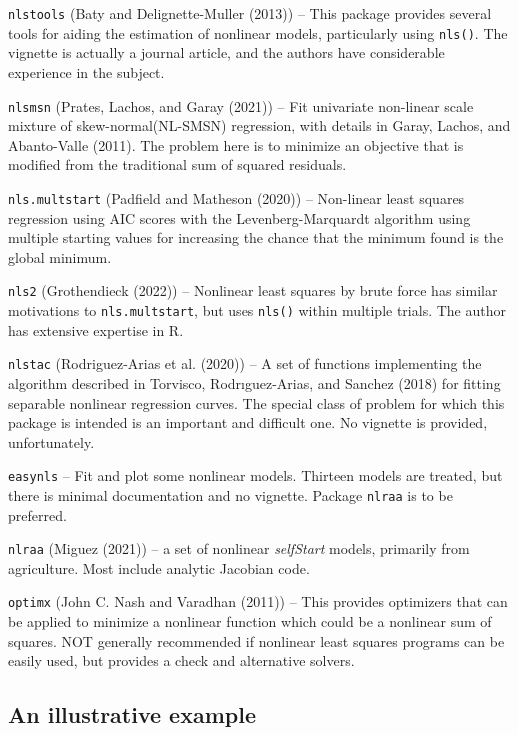 \texttt{nlstools} (Baty and Delignette-Muller (2013)) -- This package provides several tools for aiding the estimation
of nonlinear models, particularly using \texttt{nls()}. The vignette is actually a journal
article, and the authors have considerable experience in the subject.

\texttt{nlsmsn} (Prates, Lachos, and Garay (2021)) -- Fit univariate non-linear scale mixture of skew-normal(NL-SMSN)
regression, with details in Garay, Lachos, and Abanto-Valle (2011). The problem
here is to minimize an objective that is modified from the traditional sum of squared
residuals.

\texttt{nls.multstart} (Padfield and Matheson (2020)) -- Non-linear least squares regression using
AIC scores with the Levenberg-Marquardt algorithm using multiple starting values
for increasing the chance that the minimum found is the global minimum.

\texttt{nls2} (Grothendieck (2022)) -- Nonlinear least squares by brute force has similar
motivations to \texttt{nls.multstart}, but uses \texttt{nls()} within multiple trials. The author
has extensive expertise in R.

\texttt{nlstac} (Rodriguez-Arias et al. (2020)) -- A set of functions implementing the algorithm described in
Torvisco, Rodrıguez-Arias, and Sanchez (2018) for fitting separable nonlinear regression curves. The
special class of problem for which this package is intended is an important and
difficult one. No vignette is provided, unfortunately.

\texttt{easynls} -- Fit and plot some nonlinear models. Thirteen models are treated, but
there is minimal documentation and no vignette. Package \texttt{nlraa} is to be preferred.

\texttt{nlraa} (Miguez (2021)) -- a set of nonlinear \emph{selfStart} models, primarily from
agriculture. Most include analytic Jacobian code.

\texttt{optimx} (John C. Nash and Varadhan (2011)) -- This provides
optimizers that can be applied to minimize a nonlinear function which could be
a nonlinear sum of
squares. NOT generally recommended if nonlinear
least squares programs can be easily used, but provides a check and alternative
solvers.

\subsection{An illustrative example}\label{an-illustrative-example}

